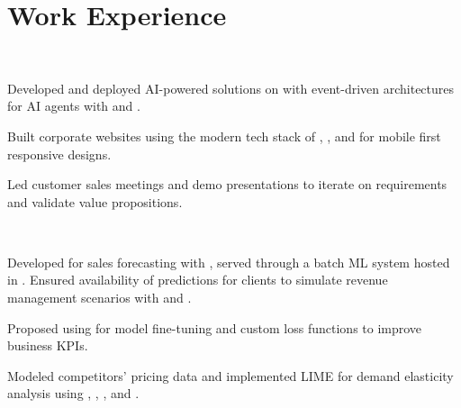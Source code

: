 \documentclass[]{tex/deedy-resume-openfont}
\begin{document}
\hfill
\begin{minipage}[t]{0.67\textwidth} 


\section{Work Experience}
\\
\vspace{\topsep}
\begin{tightemize}
    \item Developed and deployed AI-powered solutions on  with event-driven architectures for AI agents with  and .
    \item Built corporate websites using the modern tech stack of , ,  and  for mobile first responsive designs.
    \item Led customer sales meetings and demo presentations to iterate on requirements and validate value propositions.
\end{tightemize}
\sectionsep

\\
\begin{tightemize}
    \item Developed  for sales forecasting with , served through a batch ML system hosted in . Ensured availability of predictions for clients to simulate revenue management scenarios with  and .
    \item Proposed using  for model fine-tuning and custom loss functions to improve business KPIs.
    \item Modeled competitors' pricing data and implemented LIME for demand elasticity analysis using , , , and .
\end{tightemize}
\sectionsep


\end{minipage}
\end{document}
